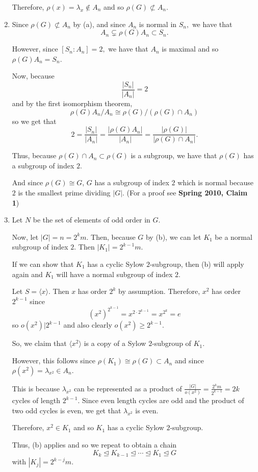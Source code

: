 \documentclass[12pt]{Qual}
\begin{document}
\begin{solution}
\begin{enumerate}[label=(\alph*)]
    Therefore, $\rho(x)=\lambda_x\notin A_n$ and so $\rho(G)\not\subset A_n.$
    \item Since $\rho(G)\not\subset A_n$ by (a), and since $A_n$ is normal in $S_n,$ we have that $$A_n\subsetneq\rho(G)A_n\subset S_n.$$

    However, since $[S_n:A_n]=2,$ we have that $A_n$ is maximal and so $\rho(G)A_n=S_n$.

    Now, because $$\frac{|S_n|}{|A_n|}=2$$ and by the first isomorphism theorem, $$\rho(G)A_n/A_n\cong\rho(G)/(\rho(G)\cap A_n)$$ so we get that $$2=\frac{|S_n|}{|A_n|}=\frac{|\rho(G)A_n|}{|A_n|}=\frac{|\rho(G)|}{|\rho(G)\cap A_n|}.$$

    Thus, because $\rho(G)\cap A_n\subset \rho(G)$ is a subgroup, we have that $\rho(G)$ has a subgroup of index $2.$

    And since $\rho(G)\cong G$, $G$ has a subgroup of index $2$ which is normal because $2$ is the smallest prime dividing $|G|.$ (For a proof see \textbf{Spring 2010, Claim 1})
    \item Let $N$ be the set of elements of odd order in $G$.

    Now, let $|G|=n=2^km$. Then, because $G$ by (b), we can let $K_1$ be a normal subgroup of index $2$. Then $|K_1|=2^{k-1}m.$

    If we can show that $K_1$ has a cyclic Sylow $2$-subgroup, then (b) will apply again and $K_1$ will have a normal subgroup of index $2.$

    Let $S=\langle x\rangle.$ Then $x$ has order $2^k$ by assumption. Therefore, $x^2$ has order $2^{k-1}$ since $$(x^2)^{2^{k-1}}=x^{2\cdot 2^{k-1}}=x^{2^k}=e$$ so $o(x^2)|2^{k-1}$ and also clearly $o(x^2)\ge 2^{k-1}.$

    So, we claim that $\langle x^2\rangle$ is a copy of a Sylow $2$-subgroup of $K_1.$

    However, this follows since $\rho(K_1)\cong\rho(G)\subset A_n$ and since $\rho(x^2)=\lambda_{x^2}\in A_n.$

    This is because $\lambda_{x^2}$ can be represented as a product of $\frac{|G|}{o(x^2)}=\frac{2^km}{2^{k-1}}=2k$ cycles of length $2^{k-1}.$ Since even length cycles are odd and the product of two odd cycles is even, we get that $\lambda_{x^2}$ is even.

    Therefore, $x^2\in K_1$ and so $K_1$ has a cyclic Sylow $2$-subgroup.

    Thus, (b) applies and so we repeat to obtain a chain $$K_k\trianglelefteq K_{k-1}\trianglelefteq \cdots\trianglelefteq K_1\trianglelefteq G$$ with $|K_j|=2^{k-j}m.$


\end{enumerate}
\end{solution}
\end{document}

